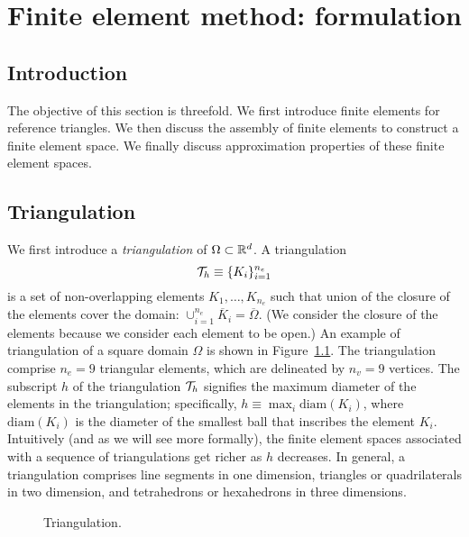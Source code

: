 \chapter{Finite element method: formulation}

\disclaimer

\section{Introduction}
The objective of this section is threefold.  We first introduce finite elements for reference triangles. We then discuss the assembly of finite elements to construct a finite element space.  We finally discuss approximation properties of these finite element spaces.


\section{Triangulation}
We first introduce a \emph{triangulation} of $\Omega \subset \mathbb{R}^d$.  A triangulation
\begin{equation*}
  \mathcal{T}_h \equiv \{ K_i \}_{i=1}^{n_e}
\end{equation*}
is a set of non-overlapping elements $K_1, \dots, K_{n_e}$ such that union of the closure of the elements cover the domain: $\cup_{i=1}^{n_e} \overline K_i = \overline \Omega$.   (We consider the closure of the elements because we consider each element to be open.) An example of triangulation of a square domain $\Omega$ is shown in Figure~\ref{fig:fe_mesh_p1}. The triangulation comprise $n_e = 9$ triangular elements, which are delineated by $n_v = 9$ vertices.  The subscript $h$ of the triangulation $\mathcal{T}_h$ signifies the maximum diameter of the elements in the triangulation; specifically, $h \equiv \max_{i} \text{diam}(K_i)$, where $\text{diam}(K_i)$ is the diameter of the smallest ball that inscribes the element $K_i$.  Intuitively (and as we will see more formally), the finite element spaces associated with a sequence of triangulations get richer as $h$ decreases.  In general, a triangulation comprises line segments in one dimension, triangles or quadrilaterals in two dimension, and tetrahedrons or hexahedrons in three dimensions.


\begin{figure}
  \centering
  \caption{Triangulation.}
  \label{fig:fe_mesh_p1}
\end{figure}

